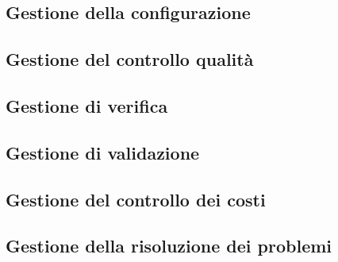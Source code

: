 \subsection{Gestione della configurazione}
\subsection{Gestione del controllo qualità}
\subsection{Gestione di verifica}
\subsection{Gestione di validazione}
\subsection{Gestione del controllo dei costi}
\subsection{Gestione della risoluzione dei problemi}

